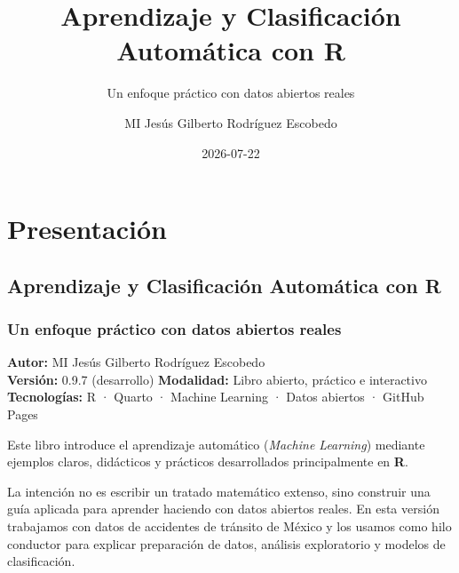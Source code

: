 \documentclass[
  spanish,
  10.5pt,
  letterpaper,
  openany,
  headings=big]{scrbook}
\title{Aprendizaje y Clasificación Automática con R}
\subtitle{Un enfoque práctico con datos abiertos reales}
\author{MI Jesús Gilberto Rodríguez Escobedo}
\date{2026-07-22}
\renewcommand{\contentsname}{Índice general}
\renewcommand*\contentsname{Tabla de contenidos}
\newcommand\contentsname{Tabla de contenidos}
\begin{document}
\frontmatter
\maketitle

\renewcommand*\contentsname{Índice general}
{
\setcounter{tocdepth}{2}
\tableofcontents
}

\mainmatter
{}

\chapter*{Presentación}\label{presentaciuxf3n}


\section*{Aprendizaje y Clasificación Automática con
R}\label{aprendizaje-y-clasificaciuxf3n-automuxe1tica-con-r}


\subsection*{Un enfoque práctico con datos abiertos
reales}\label{un-enfoque-pruxe1ctico-con-datos-abiertos-reales}

\textbf{Autor:} MI Jesús Gilberto Rodríguez Escobedo\\
\textbf{Versión:} 0.9.7 (desarrollo) \textbf{Modalidad:} Libro abierto,
práctico e interactivo\\
\textbf{Tecnologías:} R · Quarto · Machine Learning · Datos abiertos ·
GitHub Pages

Este libro introduce el aprendizaje automático (\emph{Machine Learning})
mediante ejemplos claros, didácticos y prácticos desarrollados
principalmente en \textbf{R}.

La intención no es escribir un tratado matemático extenso, sino
construir una guía aplicada para aprender haciendo con datos abiertos
reales. En esta versión trabajamos con datos de accidentes de tránsito
de México y los usamos como hilo conductor para explicar preparación de
datos, análisis exploratorio y modelos de clasificación.
\end{document}
